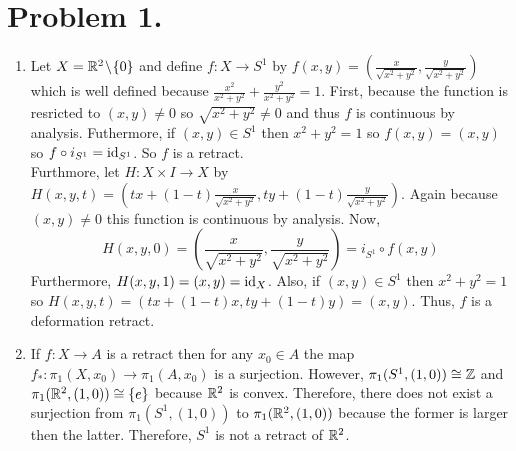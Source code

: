 \documentclass[12pt]{extarticle}
\begin{document}
 
\section*{Problem 1.}
\begin{enumerate}
\item Let $X = \mathbb{R}^2 \! \setminus \! \{0\}$ and define $f : X \to S^1$ by $f(x,y) = \left(\frac{x}{\sqrt{x^2 + y^2}}, \frac{y}{\sqrt{x^2 + y^2}} \right)$ which is well defined because $\frac{x^2}{x^2 + y^2} + \frac{y^2}{x^2 + y^2} = 1$. First, because the function is resricted to $(x, y) \neq 0$ so $\sqrt{x^2 + y^2} \neq 0$ and thus $f$ is continuous by analysis. Futhermore, if $(x,y) \in S^1$ then $x^2 + y^2 = 1$ so $f(x,y) = (x,y)$ so $f \circ i_{S^1} = \mathrm{id}_{S^1}$. So $f$ is a retract. \bigskip \\
Furthmore, let $H : X \times I \to X$ by $H(x, y, t) = \left(tx + (1 - t)\frac{x}{\sqrt{x^2 + y^2}}, ty + (1 - t)\frac{y}{\sqrt{x^2 + y^2}} \right)$. Again because $(x, y) \neq 0$ this function is continuous by analysis. Now, 
\[H(x,y,0) = \left(\frac{x}{\sqrt{x^2 + y^2}}, \frac{y}{\sqrt{x^2 + y^2}} \right) = i_{S^1} \circ f(x, y)\]
Furthermore, $H(x,y,1) = (x,y) = \mathrm{id}_X$. Also, if $(x, y) \in S^1$ then $x^2 + y^2 = 1$ so $H(x,y,t) = (tx + (1 - t) x, ty + (1 - t)y) = (x, y)$. Thus, $f$ is a deformation retract. 
\item If $f : X \to A$ is a retract then for any $x_0 \in A$ the map $f_{*} : \pi_1(X, x_0) \to \pi_1(A, x_0)$ is a surjection. However, $\pi_1(S^1, (1, 0)) \cong \mathbb{Z}$ and $\pi_1(\mathbb{R}^2, (1,0)) \cong \{e\}$ because $\mathbb{R}^2$ is convex. Therefore, there does not exist a surjection from $\pi_1(S^1, (1, 0))$ to $\pi_1(\mathbb{R}^2, (1,0))$ because the former is larger then the latter. Therefore, $S^1$ is not a retract of $\mathbb{R}^2$. 
\end{enumerate}
\end{document}
